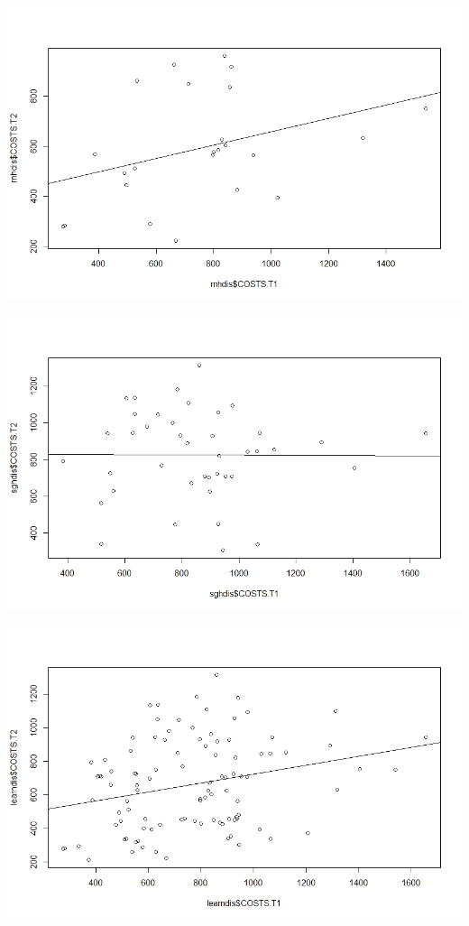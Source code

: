 \documentclass[]{article}
\begin{document}
\centering
\includegraphics[width=\textwidth]{RStudio/jpeg/Reg_RNH.jpeg}
\raggedright


\centering
\includegraphics[width=\textwidth]{RStudio/jpeg/Reg_SGH.jpeg}
\raggedright


\centering
\includegraphics[width=\textwidth]{RStudio/jpeg/Reg_COST.jpeg}
\raggedright
\end{document}
